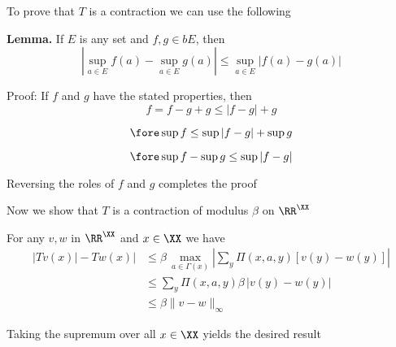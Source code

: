 \begin{frame}
    
    To prove that $T$ is a contraction we can use the following

    \textbf{Lemma.} If $E$ is any set and $f, g \in b E$, then
    \begin{equation*}
        |\sup_{a \in E} f(a) - \sup_{a \in E} g(a) |
        \leq \sup_{a \in E} | f(a) - g(a) |
    \end{equation*}

    Proof:  If $f$ and $g$ have the stated properties, then
    \begin{equation*}
        f = f - g + g \leq |f - g | + g
    \end{equation*}

    \vspace{-1em}
    \begin{equation*}
        \fore
        \sup f \leq  \sup |f - g | +  \sup g
    \end{equation*}

    \begin{equation*}
        \fore
        \sup f - \sup g \leq  \sup |f - g | 
    \end{equation*}

    Reversing the roles of $f$ and $g$ completes the proof

\end{frame}





\begin{frame}
    
    Now we show that $T$ is a contraction of modulus $\beta$ on $\RR^\XX$

        \vspace{0.5em}
        \vspace{0.5em}
    For any $v, w$ in $\RR^\XX$ and $x \in \XX$ we have
    \begin{align*}
        |T v(x)| -T w(x)|
        & \leq
        \beta \,
        \max_{a \in \Gamma(x)}
        \left| 
        \sum_y \Pi(x, a, y) [ v(y) -  w(y)]
        \right|
        \\
        & \leq 
        \sum_y \Pi(x, a, y)
        \beta \,
        \left| 
             v(y) -  w(y)
        \right|
        \\
        & \leq \beta \| v - w\|_\infty
    \end{align*}

    Taking the supremum over all $x \in \XX$ yields the desired result


\end{frame}

